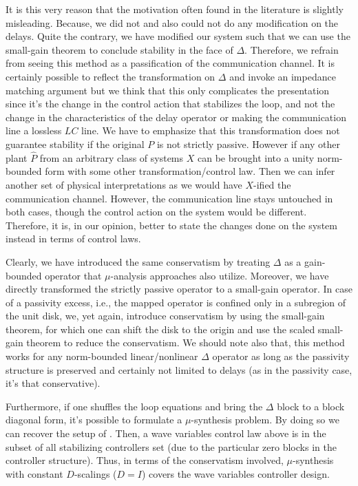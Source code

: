 It is this very reason that the motivation often found in the literature is slightly misleading. Because, we did not 
and also could not do any modification on the delays. Quite the contrary, we have modified our system such that we can use 
the small-gain theorem to conclude stability in the face of $\Delta$. Therefore, we refrain from seeing 
this method as a passification of the communication channel. It is certainly possible to reflect the transformation 
on $\Delta$ and invoke an impedance matching argument but we think that this 
only complicates the presentation since it's the change in the control action that stabilizes the loop, and not the 
change in the characteristics of the delay operator or making the communication line a lossless $LC$ line.
We have to emphasize that this transformation does not guarantee stability if the original $P$ is not strictly passive.
However if any other plant $\hat{P}$ from an arbitrary class of systems $X$ can be brought into a unity norm-bounded form 
with some other transformation/control law. Then we can infer another set of physical interpretations as we would have 
$X$-ified the communication channel. However, the communication line stays untouched in both cases, though
the control action on the system would be different. Therefore, it is, in our opinion, better to state the changes done on the
system instead in terms of control laws.  



Clearly, we have introduced the same conservatism by treating $\Delta$ as a gain-bounded operator 
that $\mu$-analysis approaches also utilize. Moreover, we have directly transformed the strictly passive 
operator to a small-gain operator. In case of a passivity excess, i.e., the mapped operator is confined only 
in a subregion of the unit disk, we, yet again, introduce conservatism by using the small-gain theorem, for which 
one can shift the disk to the origin and use the scaled small-gain theorem to reduce the conservatism. We should 
note also that, this method works for any norm-bounded linear/nonlinear $\Delta$ operator as long as the 
passivity structure is preserved and certainly not limited to delays (as in the passivity case, it's that conservative). 

Furthermore, if one shuffles the loop equations and bring the $\Delta$ block to a block diagonal form, it's possible
to formulate a $\mu$-synthesis problem. By doing so we can recover the setup of \cite{leungfa}. Then, a wave variables 
control law above is in the subset of all stabilizing controllers set (due 
to the particular zero blocks in the controller structure). Thus, in terms of the conservatism involved, 
$\mu$-synthesis with constant $D$-scalings ($D=I$) covers the wave variables controller design.

